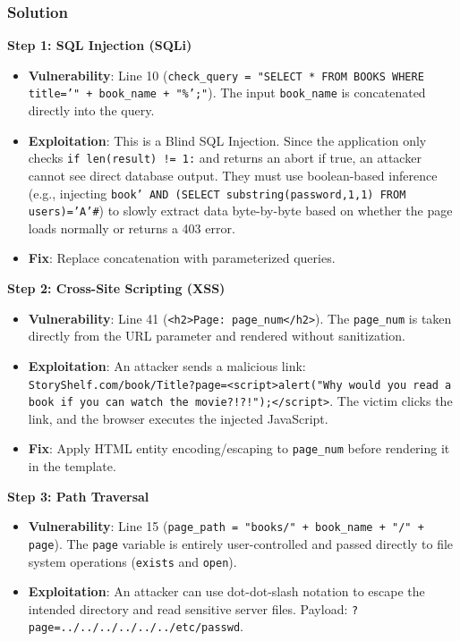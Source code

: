 \documentclass{article}
\begin{document}
\subsubsection*{Solution}
\textbf{Step 1: SQL Injection (SQLi)}
\begin{itemize}
    \item \textbf{Vulnerability}: Line 10 (\texttt{check\_query = "SELECT * FROM BOOKS WHERE title='" + book\_name + "\%';"}). The input \texttt{book\_name} is concatenated directly into the query.
    \item \textbf{Exploitation}: This is a Blind SQL Injection. Since the application only checks \texttt{if len(result) != 1:} and returns an abort if true, an attacker cannot see direct database output. They must use boolean-based inference (e.g., injecting \texttt{book' AND (SELECT substring(password,1,1) FROM users)='A'\#}) to slowly extract data byte-by-byte based on whether the page loads normally or returns a 403 error.
    \item \textbf{Fix}: Replace concatenation with parameterized queries.

\end{itemize}
\textbf{Step 2: Cross-Site Scripting (XSS)}
\begin{itemize}
    \item \textbf{Vulnerability}: Line 41 (\texttt{<h2>Page: {{page\_num}}</h2>}). The \texttt{page\_num} is taken directly from the URL parameter and rendered without sanitization.
    \item \textbf{Exploitation}: An attacker sends a malicious link: \texttt{StoryShelf.com/book/Title?page=<script>alert("Why would you read a book if you can watch the movie?!?!");</script>}. The victim clicks the link, and the browser executes the injected JavaScript.
    \item \textbf{Fix}: Apply HTML entity encoding/escaping to \texttt{page\_num} before rendering it in the template.

\end{itemize}
\textbf{Step 3: Path Traversal}
\begin{itemize}
    \item \textbf{Vulnerability}: Line 15 (\texttt{page\_path = "books/" + book\_name + "/" + page}). The \texttt{page} variable is entirely user-controlled and passed directly to file system operations (\texttt{exists} and \texttt{open}).
    \item \textbf{Exploitation}: An attacker can use dot-dot-slash notation to escape the intended directory and read sensitive server files. Payload: \texttt{?page=../../../../../../etc/passwd}.
\end{itemize}
\end{document}
